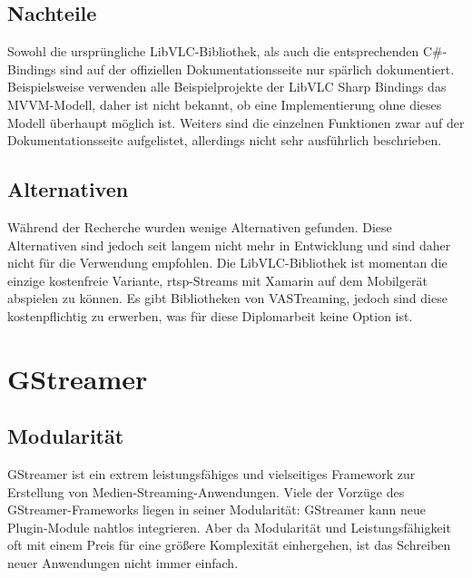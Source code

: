 \subsection{Nachteile}
Sowohl die ursprüngliche LibVLC-Bibliothek, als auch die entsprechenden C\#-Bindings sind auf der offiziellen Dokumentationsseite nur spärlich dokumentiert. \cite[vgl.][]{libvlc-sharp-doc}
Beispielsweise verwenden alle Beispielprojekte der LibVLC Sharp Bindings das MVVM-Modell, daher ist nicht bekannt, ob eine Implementierung ohne dieses Modell überhaupt möglich ist.
Weiters sind die einzelnen Funktionen zwar auf der Dokumentationsseite aufgelistet, allerdings nicht sehr ausführlich beschrieben. \cite[vgl.][]{libvlc-sharp-doc}

\subsection{Alternativen}
Während der Recherche wurden wenige Alternativen gefunden. Diese Alternativen sind jedoch seit langem nicht mehr in Entwicklung und sind daher nicht für die Verwendung empfohlen. Die LibVLC-Bibliothek ist momentan die einzige kostenfreie Variante, \ac{rtsp}-Streams mit Xamarin auf dem Mobilgerät abspielen zu können. Es gibt Bibliotheken von VASTreaming, jedoch sind diese kostenpflichtig zu erwerben, was für diese Diplomarbeit keine Option ist. \cite[vgl.][Pricing]{vastreaming}

\section{GStreamer}
\subsection{Modularität}
GStreamer ist ein extrem leistungsfähiges und vielseitiges Framework zur Erstellung von Medien-Streaming-Anwendungen.
Viele der Vorzüge des GStreamer-Frameworks liegen in seiner Modularität:
GStreamer kann neue Plugin-Module nahtlos integrieren.
Aber da Modularität und Leistungsfähigkeit oft mit einem Preis für eine größere Komplexität einhergehen, ist das Schreiben neuer Anwendungen nicht immer einfach.
\cite[aus dem Englischen übersetzt]{gstreamer}\par

